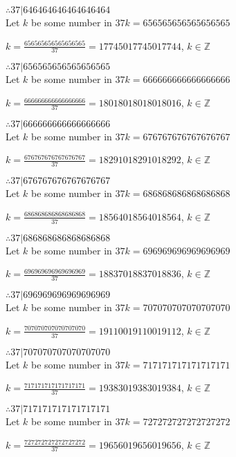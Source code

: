 \documentclass{article}
\begin{document}
$ \therefore  37|646464646464646464 $ \\

Let $k$ be some number in $37k = 656565656565656565$

$k = \frac{656565656565656565}{37} = 17745017745017744$, $k \in \mathbb{Z}$

$ \therefore  37|656565656565656565 $ \\

Let $k$ be some number in $37k = 666666666666666666$

$k = \frac{666666666666666666}{37} = 18018018018018016$, $k \in \mathbb{Z}$

$ \therefore  37|666666666666666666 $ \\

Let $k$ be some number in $37k = 676767676767676767$

$k = \frac{676767676767676767}{37} = 18291018291018292$, $k \in \mathbb{Z}$

$ \therefore  37|676767676767676767 $ \\

Let $k$ be some number in $37k = 686868686868686868$

$k = \frac{686868686868686868}{37} = 18564018564018564$, $k \in \mathbb{Z}$

$ \therefore  37|686868686868686868 $ \\

Let $k$ be some number in $37k = 696969696969696969$

$k = \frac{696969696969696969}{37} = 18837018837018836$, $k \in \mathbb{Z}$

$ \therefore  37|696969696969696969 $ \\

Let $k$ be some number in $37k = 707070707070707070$

$k = \frac{707070707070707070}{37} = 19110019110019112$, $k \in \mathbb{Z}$

$ \therefore  37|707070707070707070 $ \\

Let $k$ be some number in $37k = 717171717171717171$

$k = \frac{717171717171717171}{37} = 19383019383019384$, $k \in \mathbb{Z}$

$ \therefore  37|717171717171717171 $ \\

Let $k$ be some number in $37k = 727272727272727272$

$k = \frac{727272727272727272}{37} = 19656019656019656$, $k \in \mathbb{Z}$
\end{document}
